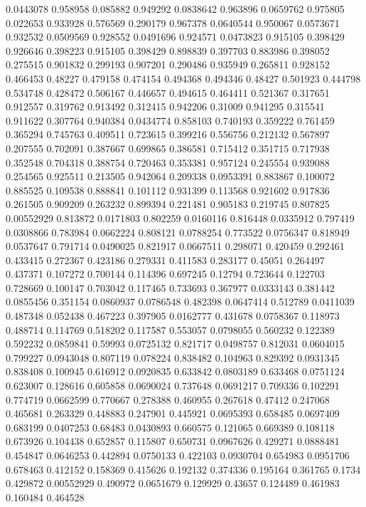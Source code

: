 0.0443078 0.958958
0.085882 0.949292
0.0838642 0.963896
0.0659762 0.975805
0.022653 0.933928
0.576569 0.290179
0.967378 0.0640544
0.950067 0.0573671
0.932532 0.0509569
0.928552 0.0491696
0.924571 0.0473823
0.915105 0.398429
0.926646 0.398223
0.915105 0.398429
0.898839 0.397703
0.883986 0.398052
0.275515 0.901832
0.299193 0.907201
0.290486 0.935949
0.265811 0.928152
0.466453 0.48227
0.479158 0.474154
0.494368 0.494346
0.48427 0.501923
0.444798 0.534748
0.428472 0.506167
0.446657 0.494615
0.464411 0.521367
0.317651 0.912557
0.319762 0.913492
0.312415 0.942206
0.31009 0.941295
0.315541 0.911622
0.307764 0.940384
0.0434774 0.858103
0.740193 0.359222
0.761459 0.365294
0.745763 0.409511
0.723615 0.399216
0.556756 0.212132
0.567897 0.207555
0.702091 0.387667
0.699865 0.386581
0.715412 0.351715
0.717938 0.352548
0.704318 0.388754
0.720463 0.353381
0.957124 0.245554
0.939088 0.254565
0.925511 0.213505
0.942064 0.209338
0.0953391 0.883867
0.100072 0.885525
0.109538 0.888841
0.101112 0.931399
0.113568 0.921602
0.917836 0.261505
0.909209 0.263232
0.899394 0.221481
0.905183 0.219745
0.807825 0.00552929
0.813872 0.0171803
0.802259 0.0160116
0.816448 0.0335912
0.797419 0.0308866
0.783984 0.0662224
0.808121 0.0788254
0.773522 0.0756347
0.818949 0.0537647
0.791714 0.0490025
0.821917 0.0667511
0.298071 0.420459
0.292461 0.433415
0.272367 0.423186
0.279331 0.411583
0.283177 0.45051
0.264497 0.437371
0.107272 0.700144
0.114396 0.697245
0.12794 0.723644
0.122703 0.728669
0.100147 0.703042
0.117465 0.733693
0.367977 0.0333143
0.381442 0.0855456
0.351154 0.0860937
0.0786548 0.482398
0.0647414 0.512789
0.0411039 0.487348
0.052438 0.467223
0.397905 0.0162777
0.431678 0.0758367
0.118973 0.488714
0.114769 0.518202
0.117587 0.553057
0.0798055 0.560232
0.122389 0.592232
0.0859841 0.59993
0.0725132 0.821717
0.0498757 0.812031
0.0604015 0.799227
0.0943048 0.807119
0.078224 0.838482
0.104963 0.829392
0.0931345 0.838408
0.100945 0.616912
0.0920835 0.633842
0.0803189 0.633468
0.0751124 0.623007
0.128616 0.605858
0.0690024 0.737648
0.0691217 0.709336
0.102291 0.774719
0.0662599 0.770667
0.278388 0.460955
0.267618 0.47412
0.247068 0.465681
0.263329 0.448883
0.247901 0.445921
0.0695393 0.658485
0.0697409 0.683199
0.0407253 0.68483
0.0430893 0.660575
0.121065 0.669389
0.108118 0.673926
0.104438 0.652857
0.115807 0.650731
0.0967626 0.429271
0.0888481 0.454847
0.0646253 0.442894
0.0750133 0.422103
0.0930704 0.654983
0.0951706 0.678463
0.412152 0.158369
0.415626 0.192132
0.374336 0.195164
0.361765 0.1734
0.429872 0.00552929
0.490972 0.0651679
0.129929 0.43657
0.124489 0.461983
0.160484 0.464528
